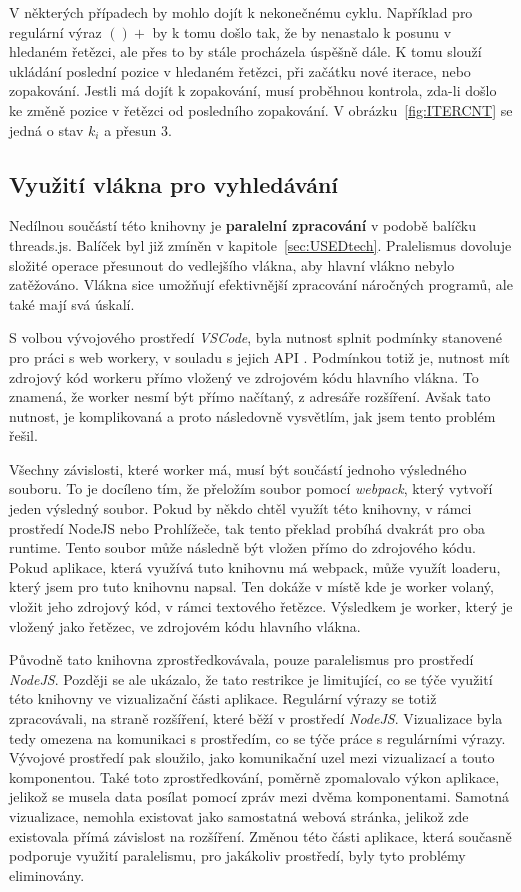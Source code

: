 V některých případech by mohlo dojít k nekonečnému cyklu.
Například pro regulární výraz $()+$ by k tomu došlo tak, že by nenastalo k posunu v hledaném řetězci, ale přes to by stále procházela úspěšně dále.
K tomu slouží ukládání poslední pozice v hledaném řetězci, při začátku nové iterace, nebo zopakování.
Jestli má dojít k zopakování, musí proběhnou kontrola, zda-li došlo ke změně pozice v řetězci od posledního zopakování.
V obrázku~\ref{fig:ITERCNT} se jedná o stav $k_i$ a přesun $3$.

\subsection*{Využití vlákna pro vyhledávání}
Nedílnou součástí této knihovny je \textbf{paralelní zpracování} v podobě balíčku threads.js.
Balíček byl již zmíněn v kapitole~\ref{sec:USEDtech}.
Pralelismus dovoluje složité operace přesunout do vedlejšího vlákna, aby hlavní vlákno nebylo zatěžováno.
Vlákna sice umožňují efektivnější zpracování náročných programů, ale také mají svá úskalí.

S volbou vývojového prostředí \textit{VSCode}, byla nutnost splnit podmínky stanovené pro práci s web workery, v souladu s jejich API \cite{Microsoft_2021}. 
Podmínkou totiž je, nutnost mít zdrojový kód workeru přímo vložený ve zdrojovém kódu hlavního vlákna.
To znamená, že worker nesmí být přímo načítaný, z adresáře rozšíření.
Avšak tato nutnost, je komplikovaná a proto následovně vysvětlím, jak jsem tento problém řešil.

Všechny závislosti, které worker má, musí být součástí jednoho výsledného souboru.
To je docíleno tím, že přeložím soubor pomocí \textit{webpack}, který vytvoří jeden výsledný soubor.
Pokud by někdo chtěl využít této knihovny, v rámci prostředí NodeJS nebo Prohlížeče, tak tento překlad probíhá dvakrát pro oba runtime.
Tento soubor může následně být vložen přímo do zdrojového kódu.
Pokud aplikace, která využívá tuto knihovnu má webpack, může využít loaderu, který jsem pro tuto knihovnu napsal. 
Ten dokáže v místě kde je worker volaný, vložit jeho zdrojový kód, v rámci textového řetězce.
Výsledkem je worker, který je vložený jako řetězec, ve zdrojovém kódu hlavního vlákna.

Původně tato knihovna zprostředkovávala, pouze paralelismus pro prostředí \textit{NodeJS}.
Později se ale ukázalo, že tato restrikce je limitující, co se týče využití této knihovny ve vizualizační části aplikace.
Regulární výrazy se totiž zpracovávali, na straně rozšíření, které běží v prostředí \textit{NodeJS}.
Vizualizace byla tedy omezena na komunikaci s prostředím, co se týče práce s regulárními výrazy.
Vývojové prostředí pak sloužilo, jako komunikační uzel mezi vizualizací a touto komponentou.
Také toto zprostředkování, poměrně zpomalovalo výkon aplikace, jelikož se musela data posílat pomocí zpráv mezi dvěma komponentami.
Samotná vizualizace, nemohla existovat jako samostatná webová stránka, jelikož zde existovala přímá závislost na rozšíření.
Změnou této části aplikace, která současně podporuje využití paralelismu, pro jakákoliv prostředí, byly tyto problémy eliminovány.


